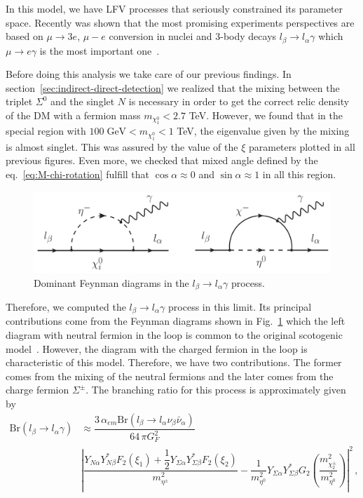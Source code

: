 \documentclass[12pt,letterpaper]{article}
\begin{document}
In this model, we have LFV processes that seriously constrained its parameter space. Recently was shown that the most promising experiments perspectives are based on $\mu\rightarrow 3 e$, $\mu - e$ conversion in nuclei and 3-body decays $l_{\beta}\rightarrow l_{\alpha}\gamma$ which $\mu\rightarrow e\gamma$ is the most important one~\cite{Rocha-Moran:2016enp}. 

Before doing this analysis we take care of our previous findings. In section~\ref{sec:indirect-direct-detection} we realized that the mixing between the triplet $\Sigma^0$ and the singlet $N$ is necessary in order to get the correct relic density of the DM with a fermion mass $m_{\chi^0_1} < 2.7$ TeV. However, we found that in the special region with $100\; \text{GeV} < m_{\chi^0_1} < 1$ TeV, the eigenvalue given by the mixing is almost singlet. This was assured by the value of the $\xi$ parameters plotted in all previous figures. 
Even more, we checked that mixed angle defined by the eq.~\ref{eq:M-chi-rotation} fulfill that $\cos\alpha\approx 0$ and $\sin\alpha\approx 1$ in all this region. 
\begin{figure}
\begin{center}
\includegraphics[scale=0.55]{LFV-diagrams}
\caption{Dominant Feynman diagrams in the $l_{\beta}\rightarrow l_{\alpha}\gamma$ process.}
\label{fig:mu-e-gamma}
\end{center}
\end{figure}
Therefore, we computed the $l_{\beta}\rightarrow l_{\alpha}\gamma$ process in this limit.
Its principal contributions come from the Feynman diagrams shown in Fig.~\ref{fig:mu-e-gamma} which the left diagram with neutral fermion in the loop is common to the original scotogenic model~\cite{Toma:2013zsa,Ibarra:2016dlb}. However, the diagram with the charged fermion in the loop is characteristic of this model. Therefore, we have two contributions. The former comes from the mixing of the neutral fermions and the later comes from the charge fermion $\Sigma^{\pm}$. The branching ratio for this process is approximately given by
\begin{align}
\label{eq:mu-e-gamma}
\text{Br}(l_{\beta}\rightarrow l_{\alpha}\gamma) &\approx
\dfrac{3\,\alpha_{em}\text{Br}(l_{\beta}\rightarrow l_{\alpha}\nu_{\beta}\bar{\nu}_{\alpha})}{64\,\pi G_F^2 } \nonumber \\
&\left|\dfrac{Y_{N\alpha}Y_{N\beta}^* F_2\left(\xi_1\right)
+\dfrac{1}{2}Y_{\Sigma\alpha}Y_{\Sigma\beta}^* F_2\left(\xi_2\right)
}{m_{\eta^{\pm}}^2}
-\dfrac{1}{m_{\eta^{0}}^2}Y_{\Sigma\alpha}Y_{\Sigma\beta}^* G_2\left(\dfrac{m_{\chi^{\pm}_2}^2}{m_{\eta^{0}}^2}\right)
\right|^2 \,,
\end{align}
\end{document}
